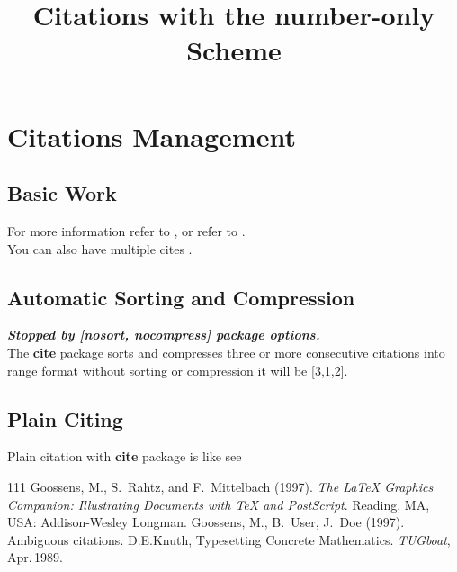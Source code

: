 \documentclass{article}
\title{\bf Citations with the number-only Scheme}
\date{}
\begin{document}
	\maketitle
	
	\section{Citations Management}
	
	\subsection{Basic Work}
	For more information refer to \cite[P.15]{LGC97}, or 
	refer to \cite[pp\,128\,--130]{GUD97}. \\[3pt]
	You can also have multiple cites \cite{LGC97,GUD97}.
	
	\subsection{Automatic Sorting and Compression}
	\textit{\bfseries Stopped by [nosort, nocompress] 				package options.} \\
	The {\bf cite} package sorts and compresses three 			or more consecutive citations into range format
	\cite{TCM,LGC97,GUD97} %
	without sorting or compression it will be [3,1,2].
	
	\subsection{Plain Citing}
	Plain citation with {\bf cite} package is like see
	
	\pagebreak
	
	\begin{thebibliography}{111}
			Goossens, M., S.~Rahtz, and F.~Mittelbach 					(1997). 
			\newblock \emph{The \LaTeX{} Graphics 						Companion: Illustrating Documents with 
			\TeX{} and PostScript}. 
			\newblock Reading, MA, USA:
			Addison-Wesley Longman.
			Goossens, M., B.~User, J.~Doe (1997). 
			\newblock Ambiguous citations.
			D.E.Knuth, Typesetting Concrete 							Mathematics. 
			\newblock \emph{TUGboat}, Apr.\,1989.
	\end{thebibliography}
\end{document}
